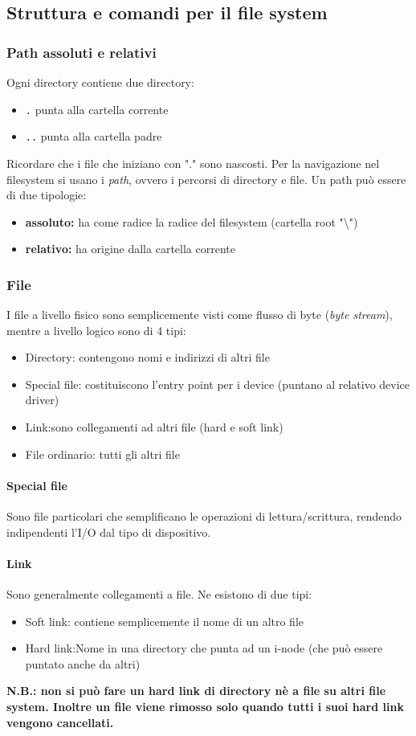 \documentclass[a4paper]{article}
\begin{document}
\subsection{Struttura e comandi per il file system}
\subsubsection{Path assoluti e relativi}
Ogni directory contiene due directory:
\begin{itemize}
\item \verb|.| punta alla cartella corrente
\item \verb|..| punta alla cartella padre
\end{itemize}
Ricordare che i file che iniziano con "." sono nascosti.
Per la navigazione nel filesystem si usano i \textit{path}, ovvero i percorsi di directory e file. Un path può essere di due tipologie:
\begin{itemize}
\item \textbf{assoluto:} ha come radice la radice del filesystem (cartella root "\textbackslash")
\item \textbf{relativo:} ha origine dalla cartella corrente
\end{itemize}

\subsubsection{File}
I file a livello fisico sono semplicemente visti come flusso di byte (\textit{byte stream}), mentre a livello logico sono di 4 tipi:
\begin{itemize}
\item Directory: contengono nomi e indirizzi di altri file
\item Special file: costituiscono l'entry point per i device (puntano al relativo device driver)
\item Link:sono collegamenti ad altri file (hard e soft link)
\item File ordinario: tutti gli altri file
\end{itemize}
\paragraph{Special file} Sono file particolari che semplificano le operazioni di lettura/scrittura, rendendo indipendenti l'I/O dal tipo di dispositivo.
\paragraph{Link}
Sono generalmente collegamenti a file. Ne esistono di due tipi:
\begin{itemize}
\item Soft link: contiene semplicemente il nome di un altro file
\item Hard link:Nome in una directory che punta ad un i-node (che può essere puntato anche da altri)
\end{itemize}
\textbf{N.B.: non si può fare un hard link di directory nè a file su altri file system. Inoltre un file viene rimosso solo quando tutti i suoi hard link vengono cancellati.}
\end{document}
